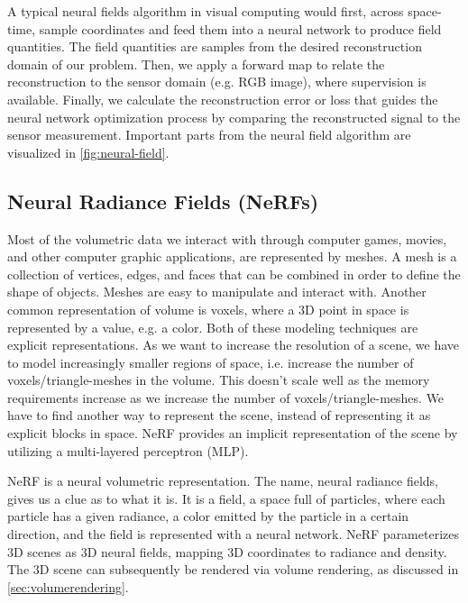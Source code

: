 A typical neural fields algorithm in visual computing would first, across space-time, sample coordinates and feed them into a neural network to produce field quantities. The field quantities are samples from the desired reconstruction domain of our problem. Then, we apply a forward map to relate the reconstruction to the sensor domain (e.g. RGB image), where supervision is available. Finally, we calculate the reconstruction error or loss that guides the neural network optimization process by comparing the reconstructed signal to the sensor measurement. Important parts from the neural field algorithm are visualized in \autoref{fig:neural-field}.





\subsection{Neural Radiance Fields (NeRFs)}
Most of the volumetric data we interact with through computer games, movies, and other computer graphic applications, are represented by meshes. A mesh is a collection of vertices, edges, and faces that can be combined in order to define the shape of objects. Meshes are easy to manipulate and interact with. Another common representation of volume is voxels, where a 3D point in space is represented by a value, e.g. a color. Both of these modeling techniques are explicit representations. As we want to increase the resolution of a scene, we have to model increasingly smaller regions of space, i.e. increase the number of voxels/triangle-meshes in the volume. This doesn't scale well as the memory requirements increase as we increase the number of voxels/triangle-meshes. We have to find another way to represent the scene, instead of representing it as explicit blocks in space. NeRF provides an implicit representation of the scene by utilizing a multi-layered perceptron (MLP).

NeRF is a neural volumetric representation. The name, neural radiance fields, gives us a clue as to what it is. It is a field, a space full of particles, where each particle has a given radiance, a color emitted by the particle in a certain direction, and the field is represented with a neural network. NeRF parameterizes 3D scenes as 3D neural fields, mapping 3D coordinates to radiance and density. The 3D scene can subsequently be rendered via volume rendering, as discussed in \autoref{sec:volumerendering}.

